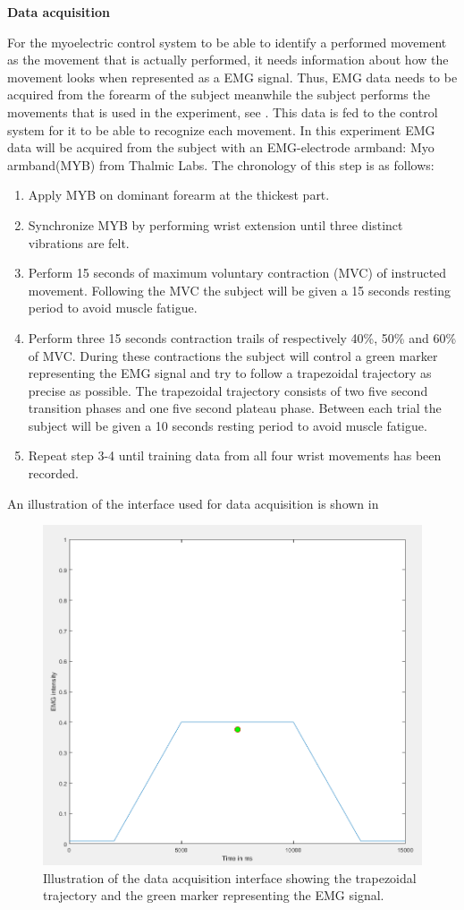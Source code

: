 \textbf{Data acquisition}

For the myoelectric control system to be able to identify a performed movement as the movement that is actually performed, it needs information about how the movement looks when represented as a EMG signal. Thus, EMG data needs to be acquired from the forearm of the subject meanwhile the subject performs the movements that is used in the experiment, see . This data is fed to the control system for it to be able to recognize each movement. In this experiment EMG data will be acquired from the subject with an EMG-electrode armband: Myo armband(MYB) from Thalmic Labs. The chronology of this step is as follows:

\begin{enumerate}
	\item Apply MYB on dominant forearm at the thickest part.
	\item Synchronize MYB by performing wrist extension until three distinct vibrations are felt.
	\item Perform 15 seconds of maximum voluntary contraction (MVC) of instructed movement. Following the MVC the subject will be given a 15 seconds resting period to avoid muscle fatigue.
	\item Perform three 15 seconds contraction trails of respectively 40\%, 50\% and 60\% of MVC. During these contractions the subject will control a green marker representing the EMG signal and try to follow a trapezoidal trajectory as precise as possible. The trapezoidal trajectory consists of two five second transition phases and one five second plateau phase. Between each trial the subject will be given a 10 seconds resting period to avoid muscle fatigue.
	\item Repeat step 3-4 until training data from all four wrist movements has been recorded.
\end{enumerate}

An illustration of the interface used for data acquisition is shown in 

\begin{figure}[H]                 
	\includegraphics[width=.4\textwidth]{figures/xBackground/dataacqGUI}  
	\caption{Illustration of the data acquisition interface showing the trapezoidal trajectory and the green marker representing the EMG signal.}
	\label{fig:dataacqGUI} 
\end{figure}

